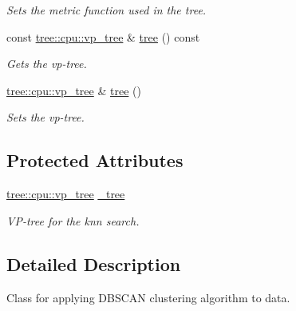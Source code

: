 \begin{DoxyCompactItemize}
\begin{DoxyCompactList}\small\item\em Sets the metric function used in the tree. \end{DoxyCompactList}\item 
\hypertarget{classcluster_1_1cpu_1_1dbscan_a20cf90d7356f7f28f30b747d0a8eff13}{}const \hyperlink{classtree_1_1cpu_1_1vp__tree}{tree\+::cpu\+::vp\+\_\+tree} \& \hyperlink{classcluster_1_1cpu_1_1dbscan_a20cf90d7356f7f28f30b747d0a8eff13}{tree} () const \label{classcluster_1_1cpu_1_1dbscan_a20cf90d7356f7f28f30b747d0a8eff13}

\begin{DoxyCompactList}\small\item\em Gets the vp-\/tree. \end{DoxyCompactList}\item 
\hypertarget{classcluster_1_1cpu_1_1dbscan_a5d800dca8e071c560c5e22c8327077c0}{}\hyperlink{classtree_1_1cpu_1_1vp__tree}{tree\+::cpu\+::vp\+\_\+tree} \& \hyperlink{classcluster_1_1cpu_1_1dbscan_a5d800dca8e071c560c5e22c8327077c0}{tree} ()\label{classcluster_1_1cpu_1_1dbscan_a5d800dca8e071c560c5e22c8327077c0}

\begin{DoxyCompactList}\small\item\em Sets the vp-\/tree. \end{DoxyCompactList}\end{DoxyCompactItemize}
\subsection*{Protected Attributes}
\begin{DoxyCompactItemize}
\item 
\hypertarget{classcluster_1_1cpu_1_1dbscan_a2834cc24b1a05284d8f2d18b3d9f7ae7}{}\hyperlink{classtree_1_1cpu_1_1vp__tree}{tree\+::cpu\+::vp\+\_\+tree} \hyperlink{classcluster_1_1cpu_1_1dbscan_a2834cc24b1a05284d8f2d18b3d9f7ae7}{\+\_\+tree}\label{classcluster_1_1cpu_1_1dbscan_a2834cc24b1a05284d8f2d18b3d9f7ae7}

\begin{DoxyCompactList}\small\item\em V\+P-\/tree for the knn search. \end{DoxyCompactList}\end{DoxyCompactItemize}


\subsection{Detailed Description}
Class for applying D\+B\+S\+C\+A\+N clustering algorithm to data. 

